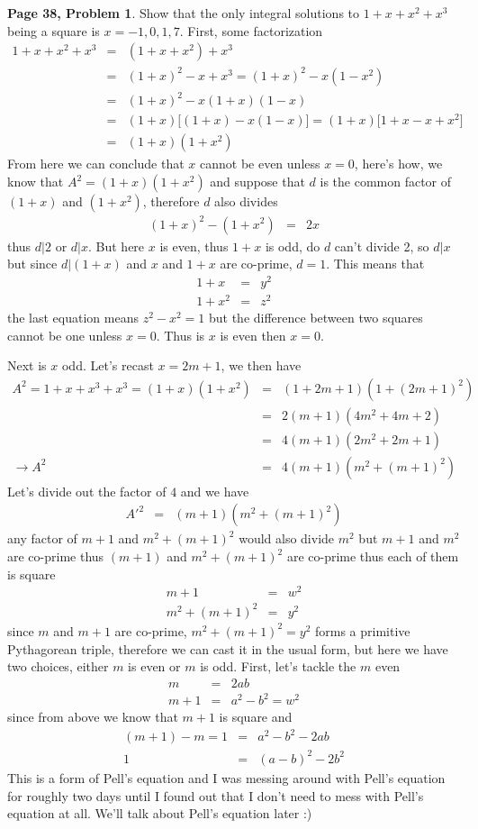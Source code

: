 \documentclass[aps,preprint,preprintnumbers,nofootinbib,showpacs,prd]{revtex4-1}
\newcommand{\nbea}{\begin{eqnarray*}}
\newcommand{\neea}{\end{eqnarray*}}
\begin{document}
{\bf Page 38, Problem 1}. Show that the only integral solutions to $1 + x + x^2 + x^3$ being a square is $x = -1,0,1,7$. First, some factorization
%
\nbea
1 + x + x^2 + x^3 & = & (1 + x + x^2) + x^3 \\
& = & (1 + x)^2 - x + x^3 = (1 + x)^2 - x(1-x^2) \\
& = & (1 + x)^2 - x(1+x)(1-x)\\
& = & (1 + x)\lbrack(1 + x) - x(1-x)\rbrack = (1 + x)\lbrack1 + x - x + x^2\rbrack \\
& = & (1+x)(1+x^2)
\neea
%
From here we can conclude that $x$ cannot be even unless $x=0$, here's how, we know that $A^2 = (1+x)(1+x^2)$ 
and suppose that $d$ is the common factor of $(1+x)$ and $(1+x^2)$, therefore $d$ also divides
%
\nbea
(1+x)^2 - (1+x^2) & = & 2x
\neea
% 
thus $d|2$ or $d|x$. But here $x$ is even, thus $1+x$ is odd, do $d$ can't divide 2, so $d|x$ but since $d|(1+x)$ and $x$ and $1+x$ are co-prime, $d=1$. This means that 
%
\nbea
1 + x & = & y^2 \\
1 + x^2 & = & z^2
\neea
%
the last equation means $z^2 - x^2 = 1$ but the difference between two squares cannot be one unless $x=0$. Thus is $x$ is even then $x = 0$.

Next is $x$ odd. Let's recast $x = 2m+1$, we then have
%
\nbea
A^2 = 1 + x + x^3 + x^3 = (1+x)(1+x^2) & = & (1 + 2m + 1)(1 + (2m + 1)^2) \\
& = & 2(m+1)(4m^2 + 4m + 2) \\
& = & 4(m+1)(2m^2 + 2m + 1) \\
\to A^2 & = & 4(m + 1)(m^2 + (m+1)^2)
\neea
%
Let's divide out the factor of $4$ and we have
%
\nbea
A'^2 & = & (m + 1)(m^2 + (m+1)^2)
\neea
%
any factor of $m+1$ and $m^2 + (m+1)^2$ would also divide $m^2$ but $m+1$ and $m^2$ are co-prime thus $(m+1)$ and $m^2 + (m+1)^2$ are co-prime thus each of them is square
%
\nbea
m + 1 & = & w^2 \\
m^2 + (m+1)^2 & = & y^2
\neea
%
since $m$ and $m+1$ are co-prime, $m^2 + (m+1)^2 = y^2$ forms a primitive Pythagorean triple, therefore we can cast it in the usual form, but here we have two choices, either $m$ is even or $m$ is odd. First, let's tackle the $m$ even
%
\nbea
m & = & 2ab \\
m + 1 & = & a^2 - b^2 = w^2
\neea
%
since from above we know that $m+1$ is square and 
%
\nbea
(m + 1) - m = 1 & = & a^2 - b^2 - 2ab \\
1 & = & (a-b)^2 - 2b^2
\neea
%
This is a form of Pell's equation and I was messing around with Pell's equation for roughly two days until I found out that I don't need to mess with Pell's equation at all. We'll talk about Pell's equation later :)
\end{document}
